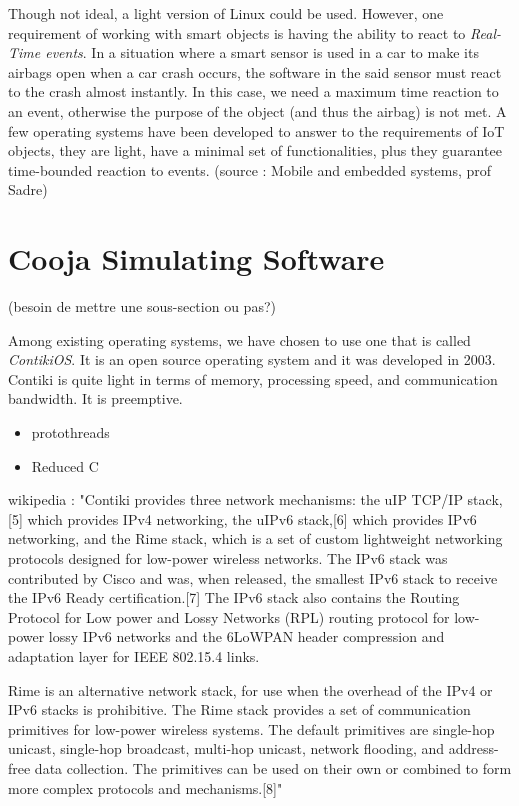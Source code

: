 Though not ideal, a light version of Linux could be used. However, one requirement of working with smart objects is having the ability to react to \textit{Real-Time events}. In a situation where a smart sensor is used in a car to make its airbags open when a car crash occurs, the software in the said sensor must react to the crash almost instantly. In this case, we need a maximum time reaction to an event, otherwise the purpose of the object (and thus the airbag) is not met. A few operating systems have been developed to answer to the requirements of IoT objects, they are light, have a minimal set of functionalities, plus they guarantee time-bounded reaction to events. (source : Mobile and embedded systems, prof Sadre)\\

\section{Cooja Simulating Software}
(besoin de mettre une sous-section ou pas?)

Among existing operating systems, we have chosen to use one that is called \textit{ContikiOS}. It is an open source operating system and it was developed in 2003. Contiki is quite light in terms of memory, processing speed, and communication bandwidth. It is preemptive.\\


\begin{itemize}
\item protothreads
\item Reduced C
\end{itemize}
wikipedia : "Contiki provides three network mechanisms: the uIP TCP/IP stack,[5] which provides IPv4 networking, the uIPv6 stack,[6] which provides IPv6 networking, and the Rime stack, which is a set of custom lightweight networking protocols designed for low-power wireless networks. The IPv6 stack was contributed by Cisco and was, when released, the smallest IPv6 stack to receive the IPv6 Ready certification.[7] The IPv6 stack also contains the Routing Protocol for Low power and Lossy Networks (RPL) routing protocol for low-power lossy IPv6 networks and the 6LoWPAN header compression and adaptation layer for IEEE 802.15.4 links.

Rime is an alternative network stack, for use when the overhead of the IPv4 or IPv6 stacks is prohibitive. The Rime stack provides a set of communication primitives for low-power wireless systems. The default primitives are single-hop unicast, single-hop broadcast, multi-hop unicast, network flooding, and address-free data collection. The primitives can be used on their own or combined to form more complex protocols and mechanisms.[8]"

